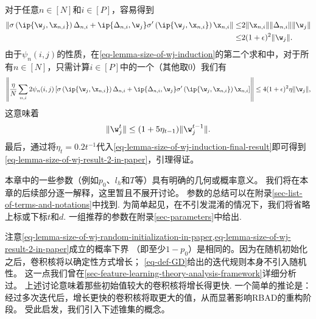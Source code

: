 \begin{myproof}
    对于任意$ n \in [N]$和$i \in [P]$，容易得到
    \begin{equation}
    \begin{aligned}
    \| \sigma\left(\ip{\w_j,\x_{n,i}}   \right) \Delta_{n,i} 
    + \ip{\Delta_{n,i}, \w_j} \sigma^{\prime}\left(\ip{\w_j,\x_{n,i}}  \right) \x_{n,i} \| 
    \leq &
    2 \|\x_{n,i}\| \|\Delta_{n,i}\| \|\w_j\| \\
    \leq  &
    2 (1+\epsilon)^2 \| \w_j \|.
    \end{aligned}
    \end{equation}
    由于$\psi_n(i,j)$的性质，在\cref{eq-lemma-size-of-wj-induction}的第二个求和中，对于所有$ n \in [N]$，只需计算$i \in [P]$中的一个（其他取$0$）我们有
    \begin{equation*}
        \left\| \frac{\eta}{N}  \sum_{n,i} 2 \psi_n(i,j) \left[ \sigma  \left(\ip{\w_j,\x_{n,i}}   \right) \Delta_{n,i} 
        + \ip{\Delta_{n,i}, \w_j} \sigma^{\prime}\left(\ip{\w_j,\x_{n,i}}  \right) \x_{n,i} \right] \right\| 
        \leq 4 (1+\epsilon)^2 \eta \| \w_j \|,
    \end{equation*}
    这意味着
    \begin{equation}\label{eq-lemma-size-of-wj-induction-final-result}
        \|\w_j^{t}\| \leq (1 + 5 \eta_{t-1})\|\w_j^{t-1}\|.
    \end{equation}
    最后，通过将$\eta_t = 0.2t^{-1}$代入\cref{eq-lemma-size-of-wj-induction-final-result}即可得到\cref{eq-lemma-size-of-wj-result-2-in-paper}，引理得证。
\end{myproof}

\begin{remark}[控制参数]
本章中的一些参数（例如$p_0$、$l_h$和$T$等）具有明确的几何或概率意义。
我们将在本章的后续部分逐一解释，这里暂且不展开讨论。
参数的总结可以在附录\cref{sec-list-of-terms-and-notations}中找到.
为简单起见，在不引发混淆的情况下，我们将省略上标或下标$t$和$d$. 
一组推荐的参数在附录\cref{sec-parameters}中给出.     
\end{remark}

注意\cref{eq-lemma-size-of-wj-random-initialization-in-paper,eq-lemma-size-of-wj-result-2-in-paper}成立的概率下界 （即至少$1-p_0$）是相同的。因为在随机初始化之后，卷积核将以确定性方式增长；
\cref{eq-def-GD}给出的迭代规则本身不引入随机性。
这一点我们曾在\cref{sec-feature-learning-theory-analysis-framework}详细分析过。
上述讨论意味着那些初始值较大的卷积核将增长得更快.
一个简单的推论是：经过多次迭代后，增长更快的卷积核将取更大的值，从而显著影响RBAD的重构阶段。
受此启发，我们引入下述锥集的概念。

